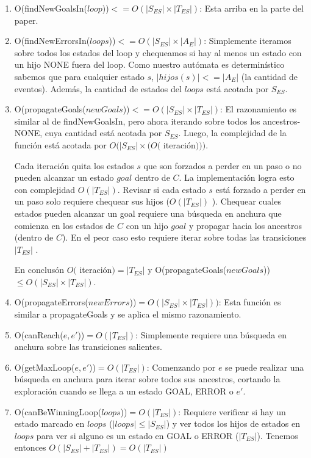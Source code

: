 \begin{enumerate}
	\item O(findNewGoalsIn($loop$))$ <= O(|S_{ES}| \times |T_{ES}|)$: Esta arriba en la parte del paper.
	
	\item O(findNewErrorsIn($loops$))$ <= O(|S_{ES}| \times |A_E|)$: Simplemente iteramos sobre todos los estados del loop y chequeamos si hay al menos un estado con un hijo NONE fuera del loop. Como nuestro autómata es determinístico sabemos que para cualquier estado $s$, 
	$|hijos(s)|<=|A_E|$ (la cantidad de eventos). Además, la cantidad de estados del $loops$ está acotada por $S_{ES}$.
	
	\item O(propagateGoals($newGoals$))$ <= O(|S_{ES}| \times |T_{ES}|)$: 
	El razonamiento es similar al de findNewGoalsIn, pero ahora iterando sobre todos los ancestros-NONE, cuya cantidad está acotada por $S_{ES}$. Luego, la complejidad de la función está acotada por $O(|S_{ES}| \times (O($ 
	iteración$)))$. 
	
	Cada iteración quita los estados $s$ que son forzados a perder en un paso o no pueden alcanzar un estado $goal$ dentro de $C$. La
	implementación logra esto con complejidad $O(|T_{ES}|)$. Revisar si cada estado $s$ está forzado a perder en un paso solo requiere chequear sus hijos ($O(|T_{ES}|)$ ). Chequear cuales estados pueden alcanzar un goal requiere una búsqueda en anchura que comienza en los estados de $C$ con un hijo $goal$ y propagar hacia los ancestros (dentro de $C$).
	En el peor caso esto requiere iterar sobre todas las transiciones $|T_{ES}|$ .
	
	En conclusón $O($ iteración$) = |T_{ES}|$  y O(propagateGoals($newGoals$))$ \leq O(|S_{ES}| \times 
	|T_{ES}|)$.
	
	\item O(propagateErrors($newErrors$))$ = O(|S_{ES}| \times |T_{ES}|))$: Esta función es similar a propagateGoals y se aplica el mismo razonamiento.	
	
	\item O(canReach($e, e'$))$ = O(|T_{ES}|)$: Simplemente requiere una búsqueda en anchura sobre las transiciones salientes.
	
	\item O(getMaxLoop($e, e'$))$ = O(|T_{ES}|)$: 
	Comenzando por $e$ se puede realizar una búsqueda en anchura para iterar sobre todos sus ancestros, cortando la exploración cuando se llega a un estado GOAL, ERROR o $e'$. 
	
	
	\item O(canBeWinningLoop($loops$))$ = O(|T_{ES}|)$: Requiere verificar si hay un estado marcado en $loops$ ($|loops| \leq |S_{ES}|$) y ver todos los hijos de estados en $loops$ para ver si alguno es un estado en GOAL o ERROR ($|T_{ES}|$).  
	Tenemos entonces $O(|S_{ES}| + |T_{ES}|) = O(|T_{ES}|)$
	
\end{enumerate}

